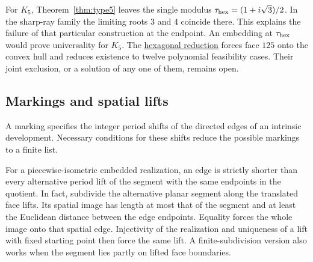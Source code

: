 \documentclass[11pt,letterpaper]{amsart}
\newcommand{\release}{bd3a0e03908481d738df30233cf95c641a1d3f71}
\newcommand{\reporef}[2]{\href{https://github.com/vltanh/lean4-origami-torus/blob/\release/#1}{#2}}
\begin{document}
For \(K_5\), Theorem~\ref{thm:type5} leaves the single modulus
\(\tau_{\rm hex}=(1+i\sqrt3)/2\). In the sharp-ray family the
limiting roots \(3\) and \(4\) coincide there. This explains the
failure of that particular construction at the endpoint. An embedding
at \(\tau_{\rm hex}\) would prove universality for \(K_5\).
The \reporef{docs/EightVertex/Type5HexagonalAngles.md}{hexagonal reduction}
forces face \(125\) onto the convex hull and reduces existence to
twelve polynomial feasibility cases. Their joint exclusion, or a
solution of any one of them, remains open.

\subsection*{Markings and spatial lifts}

A marking specifies the integer period shifts of the directed edges
of an intrinsic development. Necessary conditions for these shifts
reduce the possible markings to a finite list.

For a piecewise-isometric embedded realization, an edge is
strictly shorter than every alternative period lift of the
segment with the same endpoints in the quotient. In fact,
subdivide the alternative planar segment along the translated
face lifts. Its spatial image has length at most that of the
segment and at least the Euclidean distance between the
edge endpoints. Equality forces the whole image onto that
spatial edge. Injectivity of the realization and uniqueness
of a lift with fixed starting point then force the same
lift. A finite-subdivision version also works when the
segment lies partly on lifted face boundaries.
\end{document}
